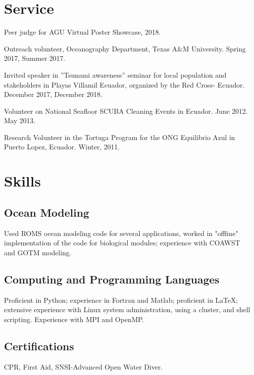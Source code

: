 \documentclass[10pt,letterpaper]{article}
\renewenvironment{itemize}{
  \begin{list}{}{
    \setlength{\leftmargin}{1.5em}
    \setlength{\itemsep}{0.25em}
    \setlength{\parskip}{0pt}
    \setlength{\parsep}{0.25em}
  }
}{
  \end{list}
}
\begin{document}
\section*{Service}
\begin{itemize}
  \item Peer judge for AGU Virtual Poster Showcase, 2018.
  \item Outreach volunteer, Oceanography Department, Texas A\&M University. Spring 2017, Summer 2017.
  \item Invited speaker in ''Tsunami awareness'' seminar for local population and stakeholders in Playas Villamil Ecuador, organized by the Red Cross- Ecuador. December 2017, December 2018.
  \item Volunteer on National Seafloor SCUBA Cleaning Events in Ecuador. June 2012. May 2013.
  \item Research Volunteer in the Tortuga Program for the ONG Equilibrio Azul in Puerto Lopez, Ecuador. Winter, 2011.

\end{itemize}

\section*{Skills}

\subsection*{Ocean Modeling}
\begin{itemize}
	\item Used ROMS ocean modeling code for several applications, worked in "offline" implementation of the code for biological modules; experience with COAWST and GOTM modeling.
\end{itemize}

\subsection*{Computing and Programming Languages}
\begin{itemize}
	\item Proficient in Python; experience in Fortran and Matlab; proficient in \LaTeX; extensive experience with Linux system administration, using a cluster, and shell scripting. Experience with MPI and OpenMP.
\end{itemize}
	
\subsection*{Certifications}
\begin{itemize}
	\item CPR, First Aid, SNSI-Advanced Open Water Diver.
\end{itemize}
\end{document}
